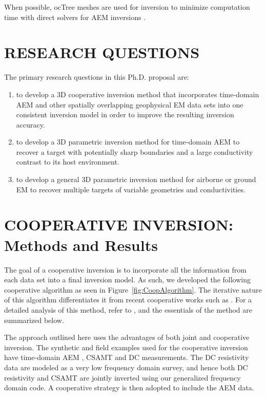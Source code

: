 \documentclass[letterpaper,11pt]{article}
\begin{document}
When possible, ocTree meshes are used for inversion to minimize computation time \cite[]{Haber2007a,Haber2007b} with direct solvers for AEM inversions \cite[]{Amestoy2001,Schenk2001}.

\section{RESEARCH QUESTIONS}

The primary research questions in this Ph.D. proposal are:
\begin{enumerate}
\item to develop a 3D cooperative inversion method that incorporates time-domain AEM and other spatially overlapping geophysical EM data sets into one consistent inversion model in order to improve the resulting inversion accuracy.
\item to develop a 3D parametric inversion method for time-domain AEM to recover a target with potentially sharp boundaries and a large conductivity contrast to its host environment.
\item to develop a general 3D parametric inversion method for airborne or ground EM to recover multiple targets of variable geometries and conductivities.
\end{enumerate}

\section{COOPERATIVE INVERSION: Methods and Results}

The goal of a cooperative inversion is to incorporate all the information from each data set into a final inversion model.  As such, we developed the following cooperative algorithm as seen in Figure~\ref{fig:CoopAlgorithm}. The iterative nature of this algorithm differentiates it from recent cooperative works such as \cite{Commer2009}. For a detailed analysis of this method, refer to \cite{McMillan2014}, and the essentials of the method are summarized below.  

The approach outlined here uses the advantages of both joint and cooperative inversion.  The synthetic and field examples used for the cooperative inversion have time-domain AEM \cite[]{Eaton2013}, CSAMT and DC measurements. The DC resistivity data are modeled as a very low frequency domain survey, and hence both DC resistivity and CSAMT are jointly inverted using our generalized frequency domain code. A cooperative strategy is then adopted to include the AEM data. 
\end{document}
